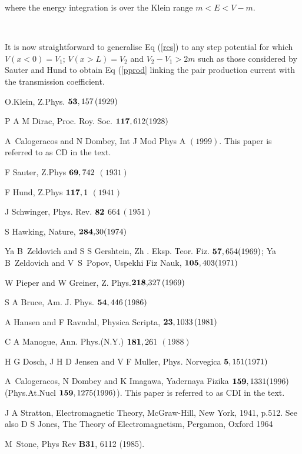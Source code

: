 \noindent where the energy integration is over the Klein range $m<E<V-m$.

\smallskip\ 

\noindent It is now straightforward to generalise Eq (\ref{res}) to any step
potential for which $V(x<0)=V_1;\,V(x>L)=V_2$ and $V_2-V_1>2m$ such as those
considered by Sauter and Hund to obtain Eq (\ref{pprod} linking the pair
production current with the transmission coefficient.

\begin{references}
  O.Klein, Z.Phys. ${\bf 53},157\,(1929)$

  P A M Dirac, Proc. Roy. Soc. ${\bf 117},612(1928)$

  A\ Calogeracos and N Dombey, Int J Mod Phys A $(1999)$.
This paper is referred to as CD in the text.

  F Sauter, Z.Phys ${\bf 69},742$ $(1931)$

  F Hund, Z.Phys ${\bf 117},1$ $(1941)$

  J Schwinger, Phys. Rev. ${\bf 82}$ $664\,(1951)$

  S Hawking, Nature, ${\bf 284,}30(1974)$

  Ya B\ Zeldovich and S S Gershtein, Zh . Eksp. Teor. Fiz. $%
{\bf 57},654(1969)$; Ya B\ Zeldovich and V\ S\ Popov, Uspekhi Fiz Nauk, $%
{\bf 105},403(1971)$

  W Pieper and W Greiner, Z. Phys.${\bf 218,}327\,(1969)$

  S A Bruce, Am. J. Phys. ${\bf 54},446\,(1986)$

  A Hansen and F Ravndal, Physica Scripta, ${\bf 23}%
,1033\,(1981)$

  C A Manogue, Ann. Phys.(N.Y.) ${\bf 181},261$ $(1988)$

  H G Dosch, J H D Jensen and V F Muller, Phys. Norvegica $%
{\bf 5},151(1971)$

  A\ Calogeracos, N Dombey and K Imagawa, Yadernaya Fizika $%
{\bf 159},1331(1996)$ (Phys.At.Nucl ${\bf 159},1275(1996)$). This paper is
referred to as CDI in the text.

  J A Stratton, Electromagnetic Theory, McGraw-Hill, New
York, 1941, p.512. See also D S Jones, The Theory of Electromagnetism,
Pergamon, Oxford 1964

  M\ Stone, Phys Rev {\bf B31}, 6112 (1985).


\end{references}
